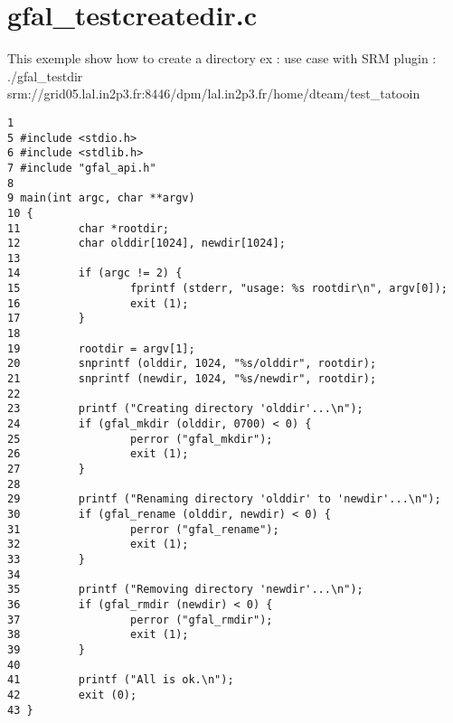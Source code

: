 \section{gfal\_\-testcreatedir.c}
This exemple show how to create a directory ex : use case with SRM plugin : ./gfal\_\-testdir srm://grid05.lal.in2p3.fr:8446/dpm/lal.in2p3.fr/home/dteam/test\_\-tatooin



\begin{DocInclude}\begin{verbatim}1 
5 #include <stdio.h>
6 #include <stdlib.h>
7 #include "gfal_api.h"
8 
9 main(int argc, char **argv)
10 {
11         char *rootdir;
12         char olddir[1024], newdir[1024];
13 
14         if (argc != 2) {
15                 fprintf (stderr, "usage: %s rootdir\n", argv[0]);
16                 exit (1);
17         }
18 
19         rootdir = argv[1];
20         snprintf (olddir, 1024, "%s/olddir", rootdir);
21         snprintf (newdir, 1024, "%s/newdir", rootdir);
22 
23         printf ("Creating directory 'olddir'...\n");
24         if (gfal_mkdir (olddir, 0700) < 0) {
25                 perror ("gfal_mkdir");
26                 exit (1);
27         }
28 
29         printf ("Renaming directory 'olddir' to 'newdir'...\n");
30         if (gfal_rename (olddir, newdir) < 0) {
31                 perror ("gfal_rename");
32                 exit (1);
33         }
34 
35         printf ("Removing directory 'newdir'...\n");
36         if (gfal_rmdir (newdir) < 0) {
37                 perror ("gfal_rmdir");
38                 exit (1);
39         }
40 
41         printf ("All is ok.\n");
42         exit (0);
43 }
\end{verbatim}
\end{DocInclude}
 